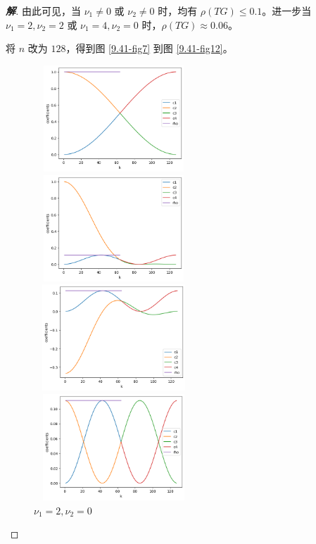 \documentclass{ctexart}
\newenvironment{sol}{\begin{proof}[\bf 解]}{\end{proof}}
\begin{document}
\begin{sol}
由此可见，当 $\nu_1\neq 0$ 或 $\nu_2\neq 0$ 时，均有 $\rho(TG)\leq 0.1$。进一步当 $\nu_1=2,\nu_2=2$ 或 $\nu_1=4,\nu_2=0$ 时，$\rho(TG) \approx 0.06$。

将 $n$ 改为 $128$，得到图 \ref{9.41-fig7} 到图 \ref{9.41-fig12}。

\begin{figure}[htbp]
    \begin{minipage}{6cm}
        \centering
        \includegraphics[width = 6cm, height = 4cm]{41-7.png}
        \caption{$\nu_1=0,\nu_2=0$}
        \label{9.41-fig7}
    \end{minipage}
    \qquad
    \begin{minipage}{6cm}
        \centering
        \includegraphics[width = 6cm, height = 4cm]{41-8.png}
        \caption{$\nu_1=0,\nu_2=2$}
        \label{9.41-fig8}
    \end{minipage}

    \begin{minipage}{6cm}
        \centering
        \includegraphics[width = 6cm, height = 4cm]{41-9.png}
        \caption{$\nu_1=1,\nu_2=1$}
        \label{9.41-fig9}
    \end{minipage}
    \qquad
    \begin{minipage}{6cm}
        \centering
        \includegraphics[width = 6cm, height = 4cm]{41-10.png}
        \caption{$\nu_1=2,\nu_2=0$}
        \label{9.41-fig10}
    \end{minipage}


\end{figure}
\end{sol}
\end{document}
